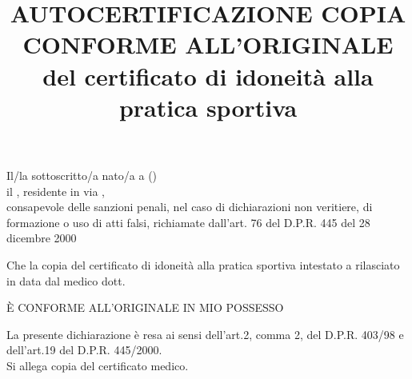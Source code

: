 \documentclass{djtsmod}
\title{AUTOCERTIFICAZIONE COPIA CONFORME ALL'ORIGINALE\\ del certificato di idoneità alla pratica sportiva}
\begin{document}
	\maketitle
	
	Il/la sottoscritto/a \fieldfill\; nato/a a \field{1.5in} (\field{0.5in}) \\ 
	il \field{1.5in}, residente in \field{2in} via \fieldfill, \\[5px]
	consapevole delle sanzioni penali, nel caso di dichiarazioni non veritiere, di formazione o uso di atti falsi, richiamate dall'art. 76 del D.P.R. 445 del 28 dicembre 2000
	
	
	Che la copia del certificato di idoneità alla pratica sportiva intestato a \field{3in} rilasciato in data \field{1.5in} dal medico dott. \fieldfill
	
	\begin{center}
		È CONFORME ALL'ORIGINALE IN MIO POSSESSO
	\end{center}
	
	La presente dichiarazione è resa ai sensi dell'art.2, comma 2, del D.P.R. 403/98 e dell'art.19 del D.P.R. 445/2000. \\[20px]
	
	Si allega copia del certificato medico.
	
	\vspace{1in}
	
\end{document}
